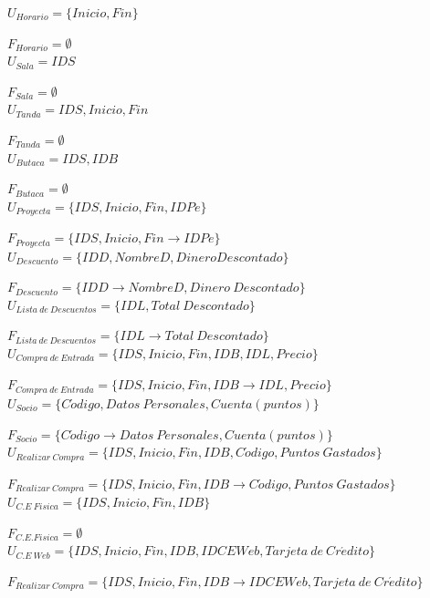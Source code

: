 	$U_{Horario}=\{Inicio, Fin\}$
		
	$F_{Horario}=\emptyset$\\
	
	$U_{Sala}={IDS}$
	
	$F_{Sala}=\emptyset$\\
	
	$U_{Tanda}={IDS,Inicio,Fin}$
		
	$F_{Tanda}=\emptyset$\\
	
	$U_{Butaca}={IDS,IDB}$
		
	$F_{Butaca}=\emptyset$\\
	
	$U_{Proyecta}=\{IDS,Inicio,Fin,IDPe\}$
	
	$F_{Proyecta}=\{IDS,Inicio,Fin\rightarrow IDPe\}$\\
	
	$U_{Descuento}=\{IDD,NombreD,DineroDescontado\}$
		
	$F_{Descuento}=\{IDD\rightarrow NombreD,Dinero~Descontado\}$\\
	
	$U_{Lista~de~Descuentos}=\{IDL,Total~Descontado\}$
		
	$F_{Lista~de~Descuentos}=\{IDL\rightarrow Total~Descontado\}$\\
	
	$U_{Compra~de~Entrada}=\{IDS,Inicio,Fin,IDB,IDL,Precio\}$
		
	$F_{Compra~de~Entrada}=\{IDS,Inicio,Fin,IDB\rightarrow IDL,Precio\}$\\
	
	$U_{Socio}=\{C\acute{o}digo,Datos~Personales,Cuenta(puntos)\}$
		
	$F_{Socio}=\{C\acute{o}digo\rightarrow Datos~Personales,Cuenta(puntos)\}$\\
	
	$U_{Realizar~Compra}=\{IDS,Inicio,Fin,IDB,C\acute{o}digo,Puntos~Gastados\}$
		
	$F_{Realizar~Compra}=\{IDS,Inicio,Fin,IDB\rightarrow C\acute{o}digo,Puntos~Gastados\}$\\
	
	$U_{C.E~Fisica}=\{IDS,Inicio,Fin,IDB\}$
		
	$F_{C.E. Fisica}=\emptyset$\\
	
	$U_{C.E~Web}=\{IDS,Inicio,Fin,IDB,IDCEWeb,Tarjeta~de~Cr\acute{e}dito\}$
		
	$F_{Realizar~Compra}=\{IDS,Inicio,Fin,IDB\rightarrow IDCEWeb,Tarjeta~de~Cr\acute{e}dito\}$\\
		
